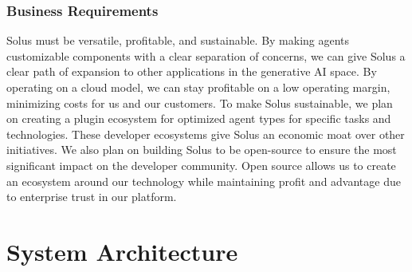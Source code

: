 \documentclass[a4paper,twocolumn,11pt]{quantumarticle}
\begin{document}
\subsubsection{Business Requirements}
Solus must be versatile, profitable, and sustainable. By making agents customizable components with a clear separation of concerns, we can give Solus a clear path of expansion to other applications in the generative AI space. By operating on a cloud model, we can stay profitable on a low operating margin, minimizing costs for us and our customers. To make Solus sustainable, we plan on creating a plugin ecosystem for optimized agent types for specific tasks and technologies. These developer ecosystems give Solus an economic moat over other initiatives. We also plan on building Solus to be open-source to ensure the most significant impact on the developer community. Open source allows us to create an ecosystem around our technology while maintaining profit and advantage due to enterprise trust in our platform.

\section{System Architecture}
\end{document}

